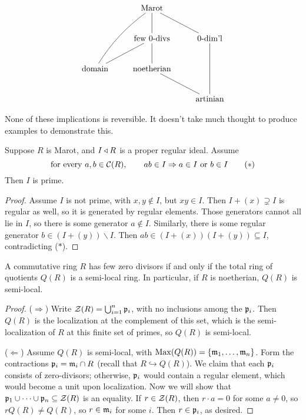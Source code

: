  \[\xymatrix{
  & \text{Marot} \ar@{-}[d] \ar@{-}@/_/[ddl] \ar@{-}[dr]\\
  & \text{few 0-divs}\ar@{-}[d] \ar@{-}[dl] & \text{0-dim'l}\ar@{-}[dd]\\
  \text{domain} & \text{noetherian}\ar@{-}[dr]\\
  & & \text{artinian}
 }\]

 None of these implications is reversible. It doesn't take much thought to produce
 examples to demonstrate this.

 \begin{proposition}
   Suppose $R$ is Marot, and $I\triangleleft R$ is a proper regular ideal. Assume
   \[
     \text{for every }a,b\in \mathcal{C}(R),\qquad ab\in I\Rightarrow a\in I \text{ or } b\in I
     \tag{$\ast$}
   \]
   Then $I$ is prime.
 \end{proposition}
 \begin{proof}
   Assume $I$ is not prime, with $x,y\not\in I$, but $xy\in I$. Then $I+(x)\supsetneq I$
   is regular as well, so it is generated by regular elements. Those generators cannot
   all lie in $I$, so there is some generator $a\not\in I$. Similarly, there is some
   regular generator $b\in (I+(y))\smallsetminus I$. Then $ab\in (I+(x))(I+(y))\subseteq
   I$, contradicting ($\ast$).
 \end{proof}
 \begin{theorem}[E.~D.~Davis]
   A commutative ring $R$ has few zero divisors if and only if the total ring of
   quotients $Q(R)$ is a semi-local ring. In particular, if $R$ is noetherian, $Q(R)$ is
   semi-local.
 \end{theorem}
 \begin{proof}
   ($\Rightarrow$) Write $\mathcal{Z}(R)=\bigcup_{i=1}^n \mathfrak{p}_i$, with no inclusions among the
   $\mathfrak{p}_i$. Then $Q(R)$ is the localization at the complement of this set, which is the
   semi-localization of $R$ at this finite set of primes, so $Q(R)$ is semi-local.

   ($\Leftarrow$) Assume $Q(R)$ is semi-local, with $\operatorname{Max}(Q(R))=\{\mathfrak{m}_1,\dots, \mathfrak{m}_n\}$.
   Form the contractions $\mathfrak{p}_i=\mathfrak{m}_i\cap R$ (recall that $R\hookrightarrow Q(R)$). We
   claim that each $\mathfrak{p}_i$ consists of zero-divisors; otherwise, $\mathfrak{p}_i$ would contain a
   regular element, which would become a unit upon localization. Now we will show that
   $\mathfrak{p}_1\cup \cdots\cup \mathfrak{p}_n\subseteq \mathcal{Z}(R)$ is an equality. If $r\in \mathcal{Z}(R)$, then
   $r\cdot a=0$ for some $a\neq 0$, so $rQ(R)\neq Q(R)$, so $r\in \mathfrak{m}_i$ for some $i$.
   Then $r\in \mathfrak{p}_i$, as desired.
 \end{proof}
